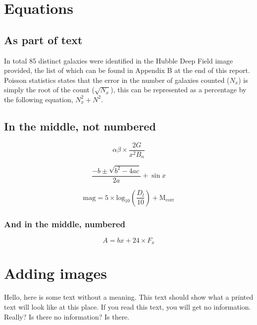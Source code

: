 \documentclass{article}
\begin{document}
\section{Equations}


\subsection{As part of text}

In total 85 distinct galaxies were identified in the Hubble Deep Field image provided, the list of which can be found in Appendix B at the end of this report. Poisson statistics states that the error in the number of galaxies counted ($N_x$) is simply the root of the count ($\sqrt{N_x}$), this can be represented as a percentage by the following equation, $N_x^2 + N^2$.

\subsection{In the middle, not numbered} 

$$ \alpha \beta \times \frac{2G}{x^2B_n}$$

$$ \frac{-b \pm \sqrt{b^2-4ac}}{2a} + \sin{x}$$

$$ \mathrm{mag} = 5 \times \mathrm{log}_{10}\left(\frac{D_{l}}{10}\right) + \mathrm{M_{corr}}$$

\subsubsection{And in the middle, numbered}
\begin{equation}
    A=bx+24\times F_x
    \label{eq:lovely formula}
\end{equation}

\section{Adding images}
Hello, here is some text without a meaning.  This text should show what a printed text will look like at this place. If you read this text, you will get no information.  Really?  Is there no information?  Is there.

\end{document}
